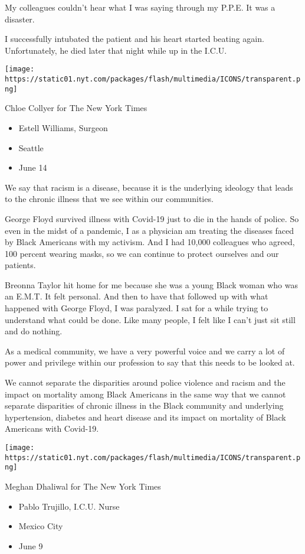 My colleagues couldn't hear what I was saying through my P.P.E. It was a
disaster.

I successfully intubated the patient and his heart started beating
again. Unfortunately, he died later that night while up in the I.C.U.

\texttt{[image: https://static01.nyt.com/packages/flash/multimedia/ICONS/transparent.png]}

Chloe Collyer for The New York Times

\begin{itemize}
\tightlist
\item
  Estell Williams, Surgeon
\item
  Seattle
\item
  June 14
\end{itemize}

We say that racism is a disease, because it is the underlying ideology
that leads to the chronic illness that we see within our communities.

George Floyd survived illness with Covid-19 just to die in the hands of
police. So even in the midst of a pandemic, I as a physician am treating
the diseases faced by Black Americans with my activism. And I had 10,000
colleagues who agreed, 100 percent wearing masks, so we can continue to
protect ourselves and our patients.

Breonna Taylor hit home for me because she was a young Black woman who
was an E.M.T. It felt personal. And then to have that followed up with
what happened with George Floyd, I was paralyzed. I sat for a while
trying to understand what could be done. Like many people, I felt like I
can't just sit still and do nothing.

As a medical community, we have a very powerful voice and we carry a lot
of power and privilege within our profession to say that this needs to
be looked at.

We cannot separate the disparities around police violence and racism and
the impact on mortality among Black Americans in the same way that we
cannot separate disparities of chronic illness in the Black community
and underlying hypertension, diabetes and heart disease and its impact
on mortality of Black Americans with Covid-19.

\texttt{[image: https://static01.nyt.com/packages/flash/multimedia/ICONS/transparent.png]}

Meghan Dhaliwal for The New York Times

\begin{itemize}
\tightlist
\item
  Pablo Trujillo, I.C.U. Nurse
\item
  Mexico City
\item
  June 9
\end{itemize}

